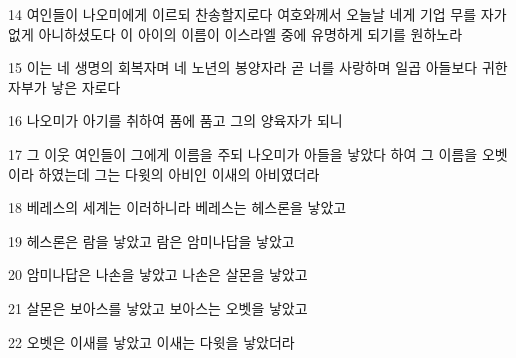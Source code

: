 \par 14 여인들이 나오미에게 이르되 찬송할지로다 여호와께서 오늘날 네게 기업 무를 자가 없게 아니하셨도다 이 아이의 이름이 이스라엘 중에 유명하게 되기를 원하노라
\par 15 이는 네 생명의 회복자며 네 노년의 봉양자라 곧 너를 사랑하며 일곱 아들보다 귀한 자부가 낳은 자로다
\par 16 나오미가 아기를 취하여 품에 품고 그의 양육자가 되니
\par 17 그 이웃 여인들이 그에게 이름을 주되 나오미가 아들을 낳았다 하여 그 이름을 오벳이라 하였는데 그는 다윗의 아비인 이새의 아비였더라
\par 18 베레스의 세계는 이러하니라 베레스는 헤스론을 낳았고
\par 19 헤스론은 람을 낳았고 람은 암미나답을 낳았고
\par 20 암미나답은 나손을 낳았고 나손은 살몬을 낳았고
\par 21 살몬은 보아스를 낳았고 보아스는 오벳을 낳았고
\par 22 오벳은 이새를 낳았고 이새는 다윗을 낳았더라


